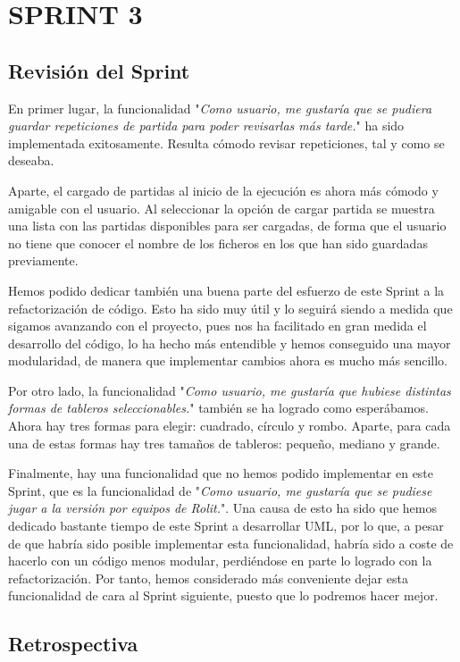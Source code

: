 \documentclass[../../SCRUM.tex]{subfiles}
\begin{document}
\section{SPRINT 3}
\subsection{Revisión del Sprint}
En primer lugar, la funcionalidad "\textit{Como usuario, me gustaría que se pudiera guardar repeticiones de partida para poder revisarlas más tarde.}" ha sido implementada exitosamente. Resulta cómodo revisar repeticiones, tal y como se deseaba.

Aparte, el cargado de partidas al inicio de la ejecución es ahora más cómodo y amigable con el usuario. Al seleccionar la opción de cargar partida se muestra una lista con las partidas disponibles para ser cargadas, de forma que el usuario no tiene que conocer el nombre de los ficheros en los que han sido guardadas previamente.

Hemos podido dedicar también una buena parte del esfuerzo de este Sprint a la refactorización de código. Esto ha sido muy útil y lo seguirá siendo a medida que sigamos avanzando con el proyecto, pues nos ha facilitado en gran medida el desarrollo del código, lo ha hecho más entendible y hemos conseguido una mayor modularidad, de manera que implementar cambios ahora es mucho más sencillo.

Por otro lado, la funcionalidad "\textit{Como usuario, me gustaría que hubiese distintas formas de tableros seleccionables.}" también se ha logrado como esperábamos. Ahora hay tres formas para elegir: cuadrado, círculo y rombo. Aparte, para cada una de estas formas hay tres tamaños de tableros: pequeño, mediano y grande.

Finalmente, hay una funcionalidad que no hemos podido implementar en este Sprint, que es la funcionalidad de "\textit{Como usuario, me  gustaría que se pudiese jugar a la versión por equipos de Rolit.}". Una causa de esto ha sido que hemos dedicado bastante tiempo de este Sprint a desarrollar UML, por lo que, a pesar de que habría sido posible implementar esta funcionalidad, habría sido a coste de hacerlo con un código menos modular, perdiéndose en parte lo logrado con la refactorización. Por tanto, hemos considerado más conveniente dejar esta funcionalidad de cara al Sprint siguiente, puesto que lo podremos hacer mejor.

\subsection{Retrospectiva}
\end{document}
